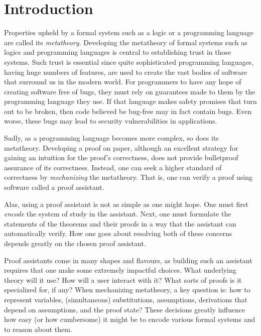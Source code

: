 \chapter{Introduction}
\label{chap:introduction}

Properties upheld by a formal system such as a logic or a programming language
are called its \emph{metatheory}.
Developing the metatheory of formal systems such as logics and programming
languages is central to establishing trust in those systems.
Such trust is essential since quite sophisticated programming languages, having
huge numbers of features, are used to create the vast bodies of software that
surround us in the modern world.
For programmers to have any hope of creating software free of bugs, they must
rely on guarantees made to them by the programming language they use.
If that language makes safety promises that turn out to be broken, then code
believed be bug-free may in fact contain bugs.
Even worse, these bugs may lead to security vulnerabilities in applications.
%

Sadly, as a programming language becomes more complex, so does its metatheory.
Developing a proof on paper, although an excellent strategy for gaining an
intuition for the proof's correctness, does not provide bulletproof assurance of
its correctness.
Instead, one can seek a higher standard of correctness by \emph{mechanizing} the
metatheory.
That is, one can verify a proof using software called a proof assistant.

Alas, using a proof assistant is not as simple as one might hope.
One must first \emph{encode} the system of study in the assistant.
Next, one must formulate the statements of the theorems and their proofs in a
way that the assistant can automatically verify.
How one goes about resolving both of these concerns depends greatly on the
chosen proof assistant.

Proof assistants come in many shapes and flavours, as building such an
assistant requires that one make some extremely impactful choices.
What underlying theory will it use?
How will a user interact with it?
What sorts of proofs is it specialized for, if any?
When mechanizing metatheory, a key question is:
how to represent variables, (simultaneous) substitutions, assumptions,
derivations that depend on assumptions, and the proof state?
These decisions greatly influence how easy (or how cumbersome) it might be to
encode various formal systems and to reason about them.

